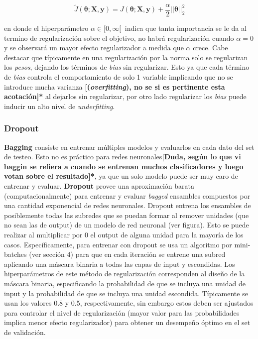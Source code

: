 \begin{equation}
\tilde{J}(\bm{\theta};\bm{X},\bm{y}) = J(\bm{\theta};\bm{X},\bm{y}) + \frac{\alpha}{2}||\bm{\theta}||^{2}_{2}
\end{equation}

en donde el hiperpar\'ametro $\alpha \in [0,\infty[\ $ indica que tanta importancia se le da al termino de regularización sobre el objetivo, no habrá regularizaci\'on cuando $\alpha = 0$ y se observará un mayor efecto regularizador a medida que $\alpha$ crece. Cabe destacar que t\'ipicamente en una regularizaci\'on por la norma solo se regularizan los \textit{pesos}, dejando los t\'erminos de \textit{bias} sin regularizar. Esto ya que cada t\'ermino de \textit{bias} controla el comportamiento de solo 1 variable implicando que no se introduce mucha varianza \textbf{[(\textit{overfitting}), no se si es pertinente esta acotación]*} al dejarlos sin regularizar, por otro lado regularizar los \textit{bias} puede inducir un alto nivel de \textit{underfitting}.

\subsubsection{Dropout}

\textbf{Bagging} consiste en entrenar m\'ultiples modelos y evaluarlos en cada dato del set de testeo. Esto no es pr\'actico para redes neuronales\textbf{[Duda, según lo que vi baggin se refiera a cuando se entrenan muchos clasificadores y luego votan sobre el resultado]*}, ya que un solo modelo puede ser muy caro de entrenar y evaluar. \textbf{Dropout} provee una aproximaci\'on barata (computacionalmente) para entrenar y evaluar \textit{bagged} ensambles compuestos por una cantidad exponencial de redes neuronales. Dropout entrena los ensambles de posiblemente todas las subredes que se puedan formar al remover unidades (que no sean las de output) de un modelo de red neuronal (ver figura). Esto se puede realizar al multiplicar por 0 el output de alguna unidad para la mayor\'ia de los casos. Espec\'ificamente, para entrenar con dropout se usa un algoritmo por mini-batches (ver secci\'on 4) para que en cada iteraci\'on se entrene una subred aplicando una m\'ascara binaria a todas las capas de input y escondidas. Los hiperpar\'ametros de este m\'etodo de regularizaci\'on corresponden al dise{\~{n}}o de la m\'ascara binaria, especificando la probabilidad de que se incluya una unidad de input y la probabilidad de que se incluya una unidad escondida. T\'ipicamente se usan los valores 0.8 y 0.5, respectivamente, sin embargo estos deben ser ajustados para controlar el nivel de regularizaci\'on (mayor valor para las probabilidades implica menor efecto regularizador) para obtener un desempe{\~{n}}o \'optimo en el set de validaci\'on.

